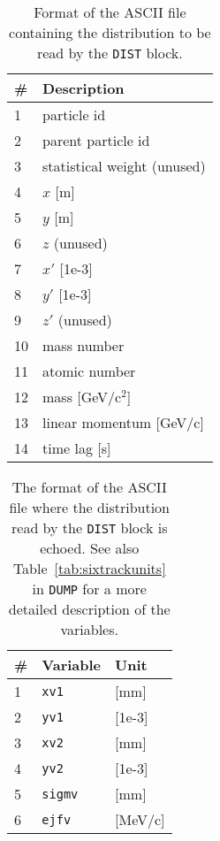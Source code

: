 \begin{center}
\begin{longtable}{|l|l|}%
    \caption{Format of the ASCII file containing the distribution to be read by the \texttt{DIST} block.}
    \label{tab:distReadFileColumns} \\*
    \hline
    \rowcolor{blue!30}
    \# & Description \\*
    \hline
    \endfirsthead
    1  & particle id \\*
    2  & parent particle id \\*
    3  & statistical weight (unused) \\*
    4  & $x$ [m] \\*
    5  & $y$ [m] \\*
    6  & $z$ (unused) \\*
    7  & $x'$ [1e-3] \\*
    8  & $y'$ [1e-3] \\*
    9  & $z'$ (unused) \\*
    10 & mass number \\*
    11 & atomic number \\*
    12 & mass [GeV/c$^2$] \\*
    13 & linear momentum [GeV/c] \\*
    14 & time lag [s] \\*
    \hline
\end{longtable}
\end{center}
\begin{center}
\begin{longtable}{|l|l|l|}
    \caption{The format of the ASCII file where the distribution read by the \texttt{DIST} block is echoed. See also Table~\ref{tab:sixtrackunits} in \texttt{DUMP} for a more detailed description of the variables.}
    \label{tab:distEchoFileColumns} \\*
    \hline
    \rowcolor{blue!30}
    \# & Variable & Unit\\*
    \hline
    \endfirsthead
    1  & \texttt{xv1}   & [mm]    \\*
    2  & \texttt{yv1}   & [1e-3]  \\*
    3  & \texttt{xv2}   & [mm]    \\*
    4  & \texttt{yv2}   & [1e-3]  \\*
    5  & \texttt{sigmv} & [mm]    \\*
    6  & \texttt{ejfv}  & [MeV/c] \\*
    \hline
\end{longtable}
\end{center}

